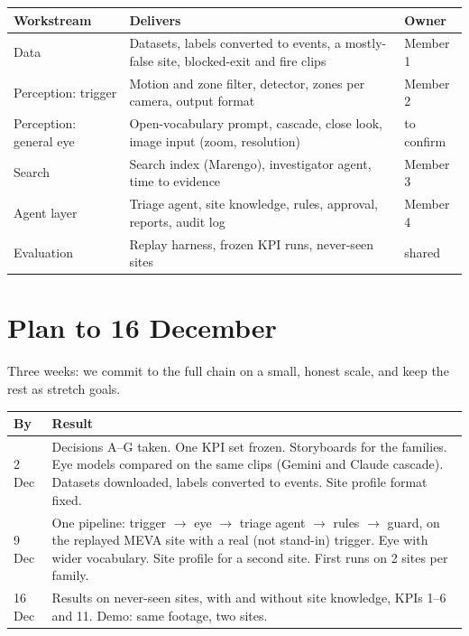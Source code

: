 \documentclass[11pt,a4paper]{article}
\begin{document}
\begin{center}
\small
\begin{tabularx}{\textwidth}{L{3.6cm}YL{2.4cm}}
\toprule
\textbf{Workstream} & \textbf{Delivers} & \textbf{Owner}\\
\midrule
Data & Datasets, labels converted to events, a mostly-false site, blocked-exit and fire clips & Member 1\\
Perception: trigger & Motion and zone filter, detector, zones per camera, output format & Member 2\\
Perception: general eye & Open-vocabulary prompt, cascade, close look, image input (zoom, resolution) & to confirm\\
Search & Search index (Marengo), investigator agent, time to evidence & Member 3\\
Agent layer & Triage agent, site knowledge, rules, approval, reports, audit log & Member 4\\
Evaluation & Replay harness, frozen KPI runs, never-seen sites & shared\\
\bottomrule
\end{tabularx}
\end{center}

\section{Plan to 16 December}
Three weeks: we commit to the full chain on a small, honest scale, and keep the rest as stretch goals.

\begin{center}
\small
\begin{tabularx}{\textwidth}{L{1.5cm}Y}
\toprule
\textbf{By} & \textbf{Result}\\
 Dec & Decisions A--G taken. One KPI set frozen. Storyboards for the families. Eye models compared on the same clips (Gemini and Claude cascade). Datasets downloaded, labels converted to events. Site profile format fixed.\\
9 Dec & One pipeline: trigger $\rightarrow$ eye $\rightarrow$ triage agent $\rightarrow$ rules $\rightarrow$ guard, on the replayed MEVA site with a real (not stand-in) trigger. Eye with wider vocabulary. Site profile for a second site. First runs on 2 sites per family.\\
16 Dec & Results on never-seen sites, with and without site knowledge, KPIs 1--6 and 11. Demo: same footage, two sites.\\
\bottomrule
\end{tabularx}
\end{center}
\end{document}
